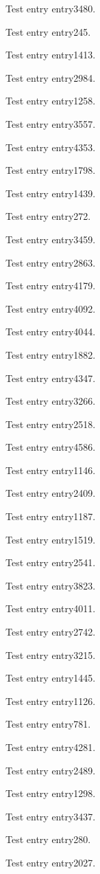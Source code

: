 Test entry \gls{entry3480}.

Test entry \gls{entry245}.

Test entry \gls{entry1413}.

Test entry \gls{entry2984}.

Test entry \gls{entry1258}.

Test entry \gls{entry3557}.

Test entry \gls{entry4353}.

Test entry \gls{entry1798}.

Test entry \gls{entry1439}.

Test entry \gls{entry272}.

Test entry \gls{entry3459}.

Test entry \gls{entry2863}.

Test entry \gls{entry4179}.

Test entry \gls{entry4092}.

Test entry \gls{entry4044}.

Test entry \gls{entry1882}.

Test entry \gls{entry4347}.

Test entry \gls{entry3266}.

Test entry \gls{entry2518}.

Test entry \gls{entry4586}.

Test entry \gls{entry1146}.

Test entry \gls{entry2409}.

Test entry \gls{entry1187}.

Test entry \gls{entry1519}.

Test entry \gls{entry2541}.

Test entry \gls{entry3823}.

Test entry \gls{entry4011}.

Test entry \gls{entry2742}.

Test entry \gls{entry3215}.

Test entry \gls{entry1445}.

Test entry \gls{entry1126}.

Test entry \gls{entry781}.

Test entry \gls{entry4281}.

Test entry \gls{entry2489}.

Test entry \gls{entry1298}.

Test entry \gls{entry3437}.

Test entry \gls{entry280}.

Test entry \gls{entry2027}.

